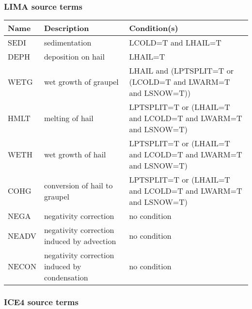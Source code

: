 \subsubsection{LIMA source terms}

\begin{longtable} {|p{}|p{}|p{}|}
\hline
Name & Description & Condition(s) \\
\hline \hline
\endhead
SEDI   & sedimentation                                 & LCOLD=T and LHAIL=T \\\hline
DEPH   & deposition on hail                            & LHAIL=T \\\hline
WETG   & wet growth of graupel                         & LHAIL and (LPTSPLIT=T or (LCOLD=T and LWARM=T and LSNOW=T)) \\\hline
HMLT   & melting of hail                               & LPTSPLIT=T or (LHAIL=T and LCOLD=T and LWARM=T and LSNOW=T) \\\hline
WETH   & wet growth of hail                            & LPTSPLIT=T or (LHAIL=T and LCOLD=T and LWARM=T and LSNOW=T) \\\hline
COHG   & conversion of hail to graupel                 & LPTSPLIT=T or (LHAIL=T and LCOLD=T and LWARM=T and LSNOW=T) \\\hline
NEGA   & negativity correction                         & no condition \\\hline
NEADV  & negativity correction induced by advection    & no condition \\\hline
NECON  & negativity correction induced by condensation & no condition \\\hline
\end{longtable}

\subsubsection{ICE4 source terms}

